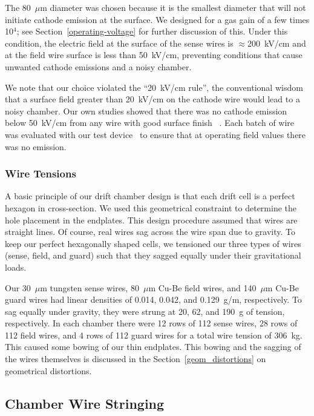 The 80~$\mu$m diameter was chosen because it is the smallest diameter
that will not initiate cathode emission at the surface.
We designed for a gas gain of a few times 
10$^4$; see Section~\ref{operating-voltage} for further discussion of this. 
Under this condition, the electric field at the surface of the sense 
wires is $\approx$200~kV/cm and at the field wire
surface is less than 50~kV/cm, preventing 
conditions that cause unwanted cathode emissions and a noisy chamber.  

We note that our choice violated the ``20~kV/cm rule'', the conventional wisdom that
a surface field greater than 20~kV/cm on the cathode wire would lead to 
a noisy chamber. Our own studies showed that there was no cathode emission below
50~kV/cm from any wire with good surface finish~\cite{cathode-emission} .  Each batch
of wire was evaluated with our test device~\cite{patent} to ensure that at operating field 
values there was no emission.  

\subsubsection{Wire Tensions}

A basic principle of our drift chamber design is that each drift cell is a perfect hexagon
in cross-section.
We used this geometrical constraint to determine the hole placement in the endplates.
This design procedure assumed that wires are straight lines.  Of course, real wires
sag across the wire span due to gravity.  To keep our perfect hexagonally shaped cells,
we tensioned our three types of wires (sense, field, and guard) such that they
sagged equally under their gravitational loads.

Our 30~$\mu$m tungsten sense wires, 80~$\mu$m Cu-Be field wires, and 140~$\mu$m Cu-Be guard
wires had linear densities of 0.014, 0.042, and 0.129~g/m, respectively.  To sag equally
under gravity, they were strung at 20, 62, and 190~g of tension, respectively.
In each chamber there were 12 rows of 112 sense wires, 28 rows of 112 field wires,
and 4 rows of 112 guard wires for a total wire tension of 306~kg.
This caused some bowing of our thin endplates. This bowing and the sagging
of the wires themselves is discussed in the Section~\ref{geom_distortions} on geometrical distortions.

\subsection{Chamber Wire Stringing}


